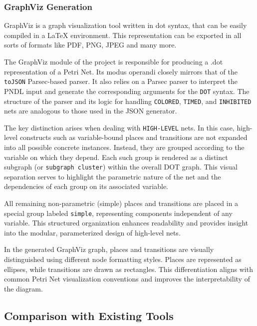 \documentclass[12pt]{article}
\begin{document}
        
        \subsubsection{GraphViz Generation}
            GraphViz is a graph visualization tool written in dot syntax, that can be easily compiled in a LaTeX environment. This representation can be exported in all sorts of formats like PDF, PNG, JPEG and many more.  

            The GraphViz module of the project is responsible for producing a .dot representation of a Petri Net. Its modus operandi closely mirrors that of the \texttt{toJSON} Parsec-based parser. It also relies on a Parsec parser to interpret the PNDL input and generate the corresponding arguments for the \texttt{DOT} syntax. The structure of the parser and its logic for handling \texttt{COLORED}, \texttt{TIMED}, and \texttt{INHIBITED} nets are analogous to those used in the JSON generator.
            
            The key distinction arises when dealing with \texttt{HIGH-LEVEL} nets. In this case, high-level constructs such as variable-bound places and transitions are not expanded into all possible concrete instances. Instead, they are grouped according to the variable on which they depend. Each such group is rendered as a distinct subgraph (or \texttt{subgraph cluster}) within the overall DOT graph. This visual separation serves to highlight the parametric nature of the net and the dependencies of each group on its associated variable.
            
            All remaining non-parametric (simple) places and transitions are placed in a special group labeled \texttt{simple}, representing components independent of any variable. This structured organization enhances readability and provides insight into the modular, parameterized design of high-level nets.

            In the generated GraphViz graph, places and transitions are visually distinguished using different node formatting styles. Places are represented as ellipses, while transitions are drawn as rectangles. This differentiation aligns with common Petri Net visualization conventions and improves the interpretability of the diagram.
    
        \subsection{Comparison with Existing Tools}
\end{document}

